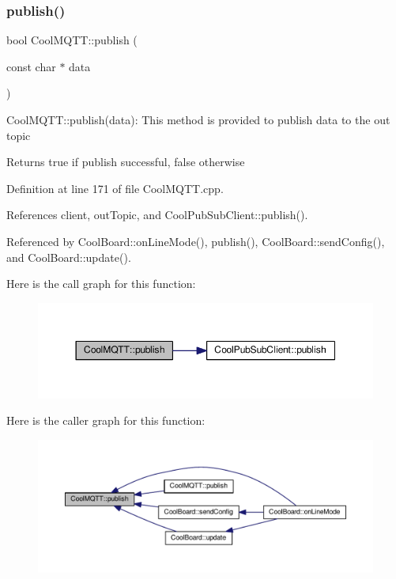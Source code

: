 \subsubsection{\texorpdfstring{publish()}{publish()}\hspace{0.1cm}{\footnotesize\ttfamily [1/2]}}
{\footnotesize\ttfamily bool Cool\+M\+Q\+T\+T\+::publish (\begin{DoxyParamCaption}\item[{const char $\ast$}]{data }\end{DoxyParamCaption})}

Cool\+M\+Q\+T\+T\+::publish(data)\+: This method is provided to publish data to the out topic

\begin{DoxyReturn}{Returns}
true if publish successful, false otherwise 
\end{DoxyReturn}


Definition at line 171 of file Cool\+M\+Q\+T\+T.\+cpp.



References client, out\+Topic, and Cool\+Pub\+Sub\+Client\+::publish().



Referenced by Cool\+Board\+::on\+Line\+Mode(), publish(), Cool\+Board\+::send\+Config(), and Cool\+Board\+::update().

Here is the call graph for this function\+:\nopagebreak
\begin{figure}[H]
\begin{center}
\leavevmode
\includegraphics[width=350pt]{d0/dd0/class_cool_m_q_t_t_ace977b3e90ab14b1199fe5c4fb0a13ec_cgraph}
\end{center}
\end{figure}
Here is the caller graph for this function\+:\nopagebreak
\begin{figure}[H]
\begin{center}
\leavevmode
\includegraphics[width=350pt]{d0/dd0/class_cool_m_q_t_t_ace977b3e90ab14b1199fe5c4fb0a13ec_icgraph}
\end{center}
\end{figure}
\mbox{\label{class_cool_m_q_t_t_a613c5e3927ae85bb94fbf648d84d8780}} 
